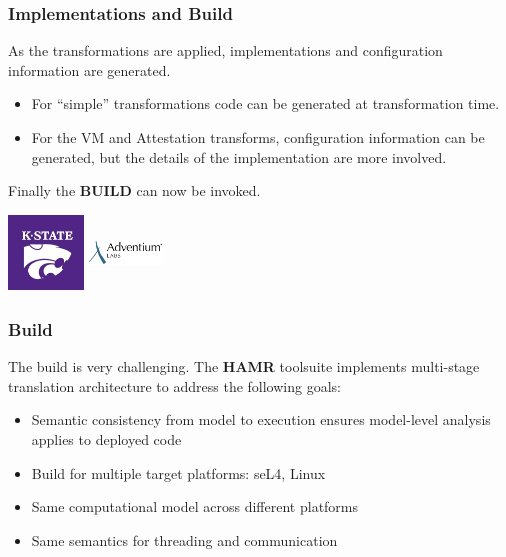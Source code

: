 \documentclass{beamer}
\begin{document}
\begin{frame}\frametitle{Implementations and Build}

As the transformations are applied, implementations and
configuration information are generated.

\begin{itemize}

  \item For ``simple'' transformations code can be generated at transformation time.
  \item For the VM and Attestation transforms, configuration
    information can be generated, but the details of the
    implementation are more involved.
\end{itemize}

Finally the \textbf{BUILD} can now be invoked.

\includegraphics[width=20mm,height=20mm]{ksu.jpg}
\includegraphics[width=20mm,height=20mm]{adventium.png}


\end{frame}

\begin{frame}\frametitle{Build}

The build is very challenging. The \textbf{HAMR} toolsuite implements
multi-stage translation architecture to address the following goals:
\begin{itemize}

\item Semantic consistency from model to execution ensures model-level
  analysis applies to deployed code

\item Build for multiple target platforms: seL4, Linux

\item Same computational model across different platforms

\item Same semantics for threading and communication

\end{itemize}

\end{frame}
\end{document}
